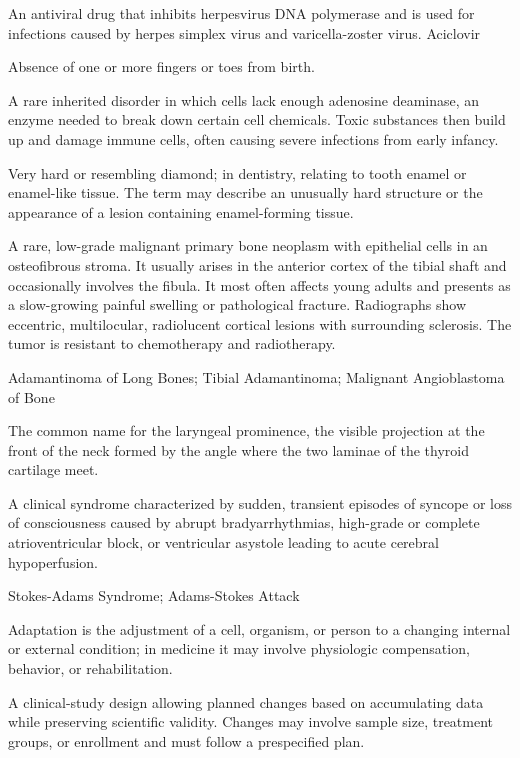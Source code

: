  An antiviral drug that inhibits herpesvirus DNA polymerase and is used for infections caused by herpes simplex virus and varicella-zoster virus.
\synonyms
Aciclovir

 Absence of one or more fingers or toes from birth.

 A rare inherited disorder in which cells lack enough adenosine deaminase, an enzyme needed to break down certain cell chemicals. Toxic substances then build up and damage immune cells, often causing severe infections from early infancy.

 Very hard or resembling diamond; in dentistry, relating to tooth enamel or enamel-like tissue. The term may describe an unusually hard structure or the appearance of a lesion containing enamel-forming tissue.

 A rare, low-grade malignant primary bone neoplasm with epithelial cells in an osteofibrous stroma. It usually arises in the anterior cortex of the tibial shaft and occasionally involves the fibula. It most often affects young adults and presents as a slow-growing painful swelling or pathological fracture. Radiographs show eccentric, multilocular, radiolucent cortical lesions with surrounding sclerosis. The tumor is resistant to chemotherapy and radiotherapy.

\synonyms
Adamantinoma of Long Bones; Tibial Adamantinoma; Malignant Angioblastoma of Bone

 The common name for the laryngeal prominence, the visible projection at the front of the
neck formed by the angle where the two laminae of the thyroid cartilage meet.

 A clinical syndrome characterized by sudden, transient episodes of syncope or loss of consciousness caused by abrupt bradyarrhythmias, high-grade or complete atrioventricular block, or ventricular asystole leading to acute cerebral hypoperfusion.

\synonyms
Stokes-Adams Syndrome; Adams-Stokes Attack

 Adaptation is the adjustment of a cell, organism, or person to a changing internal or external condition; in medicine it may involve physiologic compensation, behavior, or rehabilitation.

 A clinical-study design allowing planned changes based on accumulating data while preserving scientific validity. Changes may involve sample size, treatment groups, or enrollment and must follow a prespecified plan.

